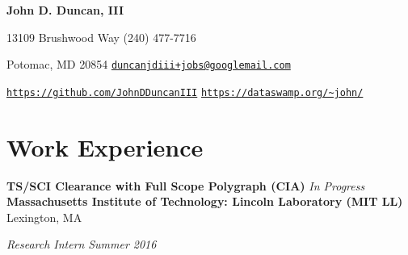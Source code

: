 \documentclass[11pt]{article}
\begin{document}
\fancyfoot{}
\pagestyle{fancy}
\thispagestyle{empty}
\renewcommand{\headrulewidth}{0pt}
\renewcommand{\footrulewidth}{0pt}

\begin{center}
	{\huge \textbf{John D. Duncan, III}}
\end{center}
13109 Brushwood Way
\hfill
(240) 477-7716

Potomac, MD 20854
\hfill
\texttt{\href{mailto:duncanjdiii+jobs@googlemail.com}{duncanjdiii+jobs@googlemail.com}}

\texttt{\url{https://github.com/JohnDDuncanIII}}
\hfill
\texttt{\url{https://dataswamp.org/~john/}}

\section*{Work Experience}
\textbf{TS/SCI Clearance with Full Scope Polygraph (CIA)}
\hfill
\textit{In Progress} \\


\textbf{Massachusetts Institute of Technology: Lincoln Laboratory (MIT LL)}
\hfill
Lexington, MA 

\textit{Research Intern}
\hfill
\textit{Summer 2016}
\end{document}
